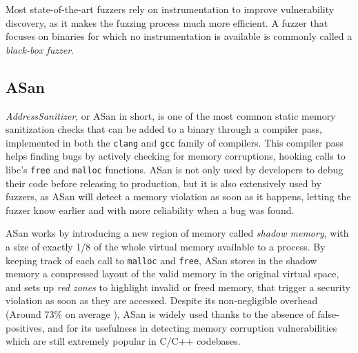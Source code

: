 \documentclass[a4paper,11pt,oneside]{report}
\newcommand{\todo}[1]{%
	\begingroup 
	\sethlcolor{cyan}%
	\hl{TODO: #1}%
	\endgroup
}
\begin{document}
Most state-of-the-art fuzzers rely on instrumentation to improve vulnerability 
discovery, as it makes the fuzzing process much more efficient. A fuzzer that 
focuses on binaries for which no instrumentation is available is commonly 
called a \emph{black-box fuzzer}. 

\subsection{ASan}
\emph{AddressSanitizer}, or ASan in short, is one of the most common static 
memory sanitization checks that can be added to a binary through a compiler 
pass, implemented in both the \texttt{clang} and \texttt{gcc} family of 
compilers. This compiler pass helps finding bugs by actively checking for 
memory corruptions, hooking calls to libc's  \texttt{free} and \texttt{malloc} 
functions. ASan is not only used by developers to debug their code before 
releasing to production, but it is also extensively used by fuzzers, as ASan 
will detect a memory violation as soon as it happens, letting the fuzzer know 
earlier and with more reliability when a bug was found. 

ASan works by introducing a new region of memory called \emph{shadow memory}, 
with a size of exactly 1/8 of the whole virtual memory available to a process.
By keeping track of each call to \texttt{malloc} and \texttt{free}, ASan stores 
in the shadow memory a compressed layout of the valid memory in the original 
virtual space, and sets up \emph{red zones} to highlight invalid or freed 
memory, that trigger a security violation as soon as they are accessed. Despite 
its non-negligible overhead (Around 73\% on average \cite{asanoverhead}), ASan 
is widely used thanks to the absence of false-positives, and for its usefulness 
in detecting memory corruption vulnerabilities which are still extremely 
popular in C/C++ codebases.






\end{document}
